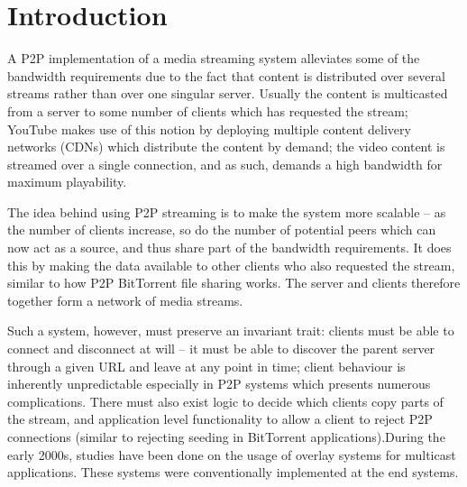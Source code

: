 \documentclass[fleqn,24pt]{SelfArx} %
\affiliation{\textsuperscript{1}\textit{y9u8, ialcuaz@alumni.ubc.ca}} %
\affiliation{\textsuperscript{2}\textit{i2u9a, shariqazz15@gmail.com}} %
\affiliation{\textsuperscript{3}\textit{o3d7, mimi@dbzmail.com}} %
\affiliation{\textsuperscript{4}\textit{i1u9a, abrar.musa.89@gmail.com}} %
\begin{document}
\flushbottom %

\maketitle %

\tableofcontents

\thispagestyle{empty} %


\section{Introduction} %

A P2P implementation of a media streaming system alleviates some of the bandwidth requirements due to the fact that content is distributed over several streams rather than over one singular server. Usually the content is multicasted from a server to some number of clients which has requested the stream; YouTube makes use of this notion by deploying multiple content delivery networks (CDNs) which distribute the content by demand; the video content is streamed over a single connection, and as such, demands a high bandwidth for maximum playability. 

The idea behind using P2P streaming is to make the system more scalable -- as the number of clients increase, so do the number of potential peers which can now act as a source, and thus share part of the bandwidth requirements. It does this by making the data available to other clients who also requested the stream, similar to how P2P BitTorrent file sharing works. The server and clients therefore together form a network of media streams.

Such a system, however, must preserve an invariant trait: clients must be able to connect and disconnect at will -- it must be able to discover the parent server through a given URL and leave at any point in time; client behaviour is inherently unpredictable especially in P2P systems which presents numerous complications. There must also exist logic to decide which clients copy parts of the stream, and application level functionality to allow a client to reject P2P connections (similar to rejecting seeding in BitTorrent applications).During the early 2000s, studies have been done on the usage of overlay systems for multicast applications. These systems were conventionally implemented at the end systems.
\end{document}
